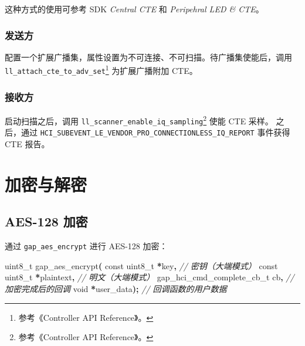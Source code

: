 \documentclass[
  12pt,
]{book}
\newenvironment{Shaded}{\begin{snugshade}}{\end{snugshade}}
\newcommand{\CommentTok}[1]{\textcolor[rgb]{0.56,0.35,0.01}{\textit{#1}}}
\newcommand{\DataTypeTok}[1]{\textcolor[rgb]{0.13,0.29,0.53}{#1}}
\newcommand{\NormalTok}[1]{#1}
\newcommand{\OperatorTok}[1]{\textcolor[rgb]{0.81,0.36,0.00}{\textbf{#1}}}
\begin{document}
这种方式的使用可参考 SDK \emph{Central CTE} 和 \emph{Peripehral LED \& CTE}。

\hypertarget{ux53d1ux9001ux65b9-2}{%
\subsubsection{发送方}\label{ux53d1ux9001ux65b9-2}}

配置一个扩展广播集，属性设置为不可连接、不可扫描。待广播集使能后，调用 \texttt{ll\_attach\_cte\_to\_adv\_set}\footnote{参考《Controller API Reference》。}
为扩展广播附加 CTE。

\hypertarget{ux63a5ux6536ux65b9-2}{%
\subsubsection{接收方}\label{ux63a5ux6536ux65b9-2}}

启动扫描之后，调用 \texttt{ll\_scanner\_enable\_iq\_sampling}\footnote{参考《Controller API Reference》。} 使能 CTE 采样。
之后，通过 \texttt{HCI\_SUBEVENT\_LE\_VENDOR\_PRO\_CONNECTIONLESS\_IQ\_REPORT} 事件获得 CTE 报告。

\hypertarget{ux52a0ux5bc6ux4e0eux89e3ux5bc6}{%
\section{加密与解密}\label{ux52a0ux5bc6ux4e0eux89e3ux5bc6}}

\hypertarget{aes-128-ux52a0ux5bc6}{%
\subsection{AES-128 加密}\label{aes-128-ux52a0ux5bc6}}

通过 \texttt{gap\_aes\_encrypt} 进行 AES-128 加密：

\begin{Shaded}
\begin{Highlighting}[]
\DataTypeTok{uint8\_t}\NormalTok{ gap\_aes\_encrypt}\OperatorTok{(}
  \DataTypeTok{const} \DataTypeTok{uint8\_t} \OperatorTok{*}\NormalTok{key}\OperatorTok{,}           \CommentTok{// 密钥（大端模式）}
  \DataTypeTok{const} \DataTypeTok{uint8\_t} \OperatorTok{*}\NormalTok{plaintext}\OperatorTok{,}     \CommentTok{// 明文（大端模式）}
\NormalTok{  gap\_hci\_cmd\_complete\_cb\_t cb}\OperatorTok{,} \CommentTok{// 加密完成后的回调}
  \DataTypeTok{void} \OperatorTok{*}\NormalTok{user\_data}\OperatorTok{);}             \CommentTok{// 回调函数的用户数据}
\end{Highlighting}
\end{Shaded}
\end{document}
